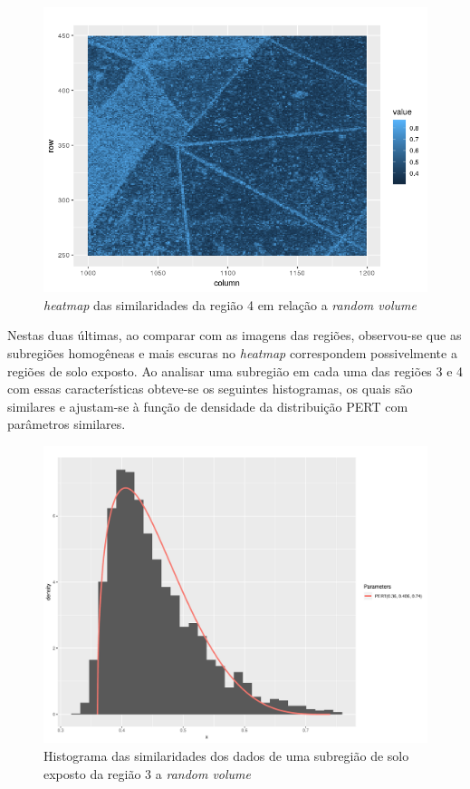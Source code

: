 \documentclass[12pt]{article}
\begin{document}
\begin{figure}[!h]

  \centering
  \includegraphics[width=0.8\linewidth]{../../Images/Report_19_02_27/heatmap_rv_region4.png}
  \caption{\textit{heatmap} das similaridades da região 4 em relação a \textit{random volume}}
  \label{fig:heat_rv4}

\end{figure}

\newpage

Nestas duas últimas, ao comparar com as imagens das regiões, observou-se que as subregiões homogêneas e mais escuras no \textit{heatmap} correspondem possivelmente a regiões de solo exposto. Ao analisar uma subregião em cada uma das regiões 3 e 4 com essas características obteve-se os seguintes histogramas, os quais são similares e ajustam-se à função de densidade da distribuição PERT com parâmetros similares.

\begin{figure}[!h]

  \centering
  \includegraphics[width=0.75\linewidth]{../../Figures/Report_19_02_27/hist_rv_subregion3.pdf}
  \caption{Histograma das similaridades dos dados de uma subregião de solo exposto da região 3 a \textit{random volume}}
  \label{fig:hist_sub_rv3}

\end{figure}
\end{document}
